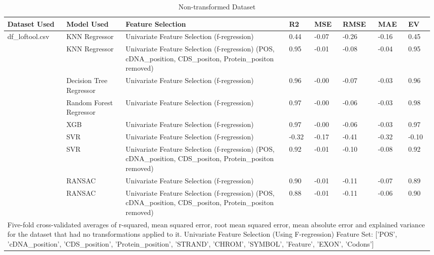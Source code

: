 \documentclass[journal,two side,web]{ieeecolor}
\begin{document}
\clearpage
\begin{table}
\centering
\begin{minipage}{\textwidth}
\centering
\caption{Non-transformed Dataset}
\label{table}
\setlength{\tabcolsep}{3pt}
\begin{tabular}{|p{50pt}|p{100pt}|p{150pt}|p{25pt}|p{25pt}|p{25pt}|p{25pt}|p{25
pt}|}
\hline
Dataset Used & Model Used & Feature Selection & R2 & MSE & RMSE & MAE & EV \\
\hline
df\_loftool.csv & KNN Regressor & Univariate Feature Selection (f-regression) & 0.44 & -0.07 & -0.26 & -0.16 & 0.45 \\
\hline
 & KNN Regressor & Univariate Feature Selection (f-regression) (POS, cDNA\_position, CDS\_positon, Protein\_positon removed) & 0.95 & -0.01 & -0.08 & -0.04 & 0.95 \\
\hline
 & Decision Tree Regressor & Univariate Feature Selection (f-regression) & 0.96 & -0.00 & -0.07 & -0.03 & 0.96 \\
\hline
& Random Forest Regressor & Univariate Feature Selection (f-regression) & 0.97 & -0.00 & -0.06 & -0.03 & 0.98 \\
\hline
 & XGB & Univariate Feature Selection (f-regression) & 0.97 & -0.00 & -0.06 & -0.03 & 0.97 \\
\hline
& SVR & Univariate Feature Selection (f-regression) & -0.32 & -0.17 & -0.41 & -0.32 & -0.10 \\
\hline
 & SVR & Univariate Feature Selection (f-regression) (POS, cDNA\_position, CDS\_positon, Protein\_positon removed) & 0.92 & -0.01 & -0.10 & -0.08 & 0.92 \\
\hline
& RANSAC & Univariate Feature Selection (f-regression) & 0.90 & -0.01 & -0.11 & -0.07 & 0.89 \\
\hline
 & RANSAC & Univariate Feature Selection (f-regression) (POS, cDNA\_position, CDS\_positon, Protein\_positon removed) & 0.88 & -0.01 & -0.11 & -0.06 & 0.90 \\
\hline
\multicolumn{8}{p{450pt}}{Five-fold cross-validated averages of r-squared, mean squared error, root mean squared error, mean absolute error and explained variance for the dataset that had no transformations applied to it. Univariate Feature Selection (Using F-regression) Feature Set: ['POS', 'cDNA\_position', 'CDS\_position', 'Protein\_position', 'STRAND', 'CHROM', 'SYMBOL', 'Feature', 'EXON', 'Codons']}\\
\end{tabular}
\end{minipage}
\end{table}
\end{document}
